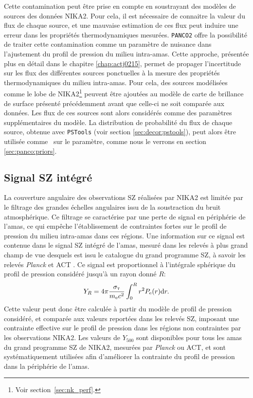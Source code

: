 Cette contamination peut être prise en compte en soustrayant des modèles de sources des données NIKA2.
Pour cela, il est nécessaire de connaitre la valeur du flux de chaque source, et une mauvaise estimation de ces flux peut induire une erreur dans les propriétés thermodynamiques mesurées.
\texttt{PANCO2} offre la possibilité de traiter cette contamination comme un paramètre de nuisance dans l'ajustement du profil de pression du milieu intra-amas.
Cette approche, présentée plus en détail dans le chapitre \ref{chap:actj0215}, permet de propager l'incertitude sur les flux des différentes sources ponctuelles à la mesure des propriétés thermodynamiques du milieu intra-amas.
Pour cela, des sources modélisées comme le lobe de NIKA2\footnote{Voir section~\ref{sec:nk_perf}.} peuvent être ajoutées au modèle de carte de brillance de surface présenté précédemment avant que celle-ci ne soit comparée aux données.
Les flux de ces sources sont alors considérés comme des paramètres supplémentaires du modèle.
La distribution de probabilité du flux de chaque source, obtenue avec \texttt{PSTools} (voir section \ref{sec:decor:pstools}), peut alors être utilisée comme \prior\ sur le paramètre, comme nous le verrons en section \ref{sec:panco:priors}.

\subsection{Signal SZ intégré}

La couverture angulaire des observations SZ réalisées par NIKA2 est limitée par le filtrage des grandes échelles angulaires issu de la soustraction du bruit atmosphérique.
Ce filtrage se caractérise par une perte de signal en périphérie de l'amas, ce qui empêche l'établissement de contraintes fortes sur le profil de pression du milieu intra-amas dans ces régions.
Une information sur ce signal est contenue dans le signal SZ intégré de l'amas, mesuré dans les relevés à plus grand champ de vue desquels est issu le catalogue du grand programme SZ, à savoir les relevés \textit{Planck} \cite{planck_collaboration_planck_2016-2} et ACT \cite{hasselfield_atacama_2013}.
Ce signal est proportionnel à l'intégrale sphérique du profil de pression considéré jusqu'à un rayon donné $R$:
\begin{equation}
    Y_R = 4 \pi \frac{\sigma_\textsc{t}}{m_{\rm e} c^2} \int_0^R r^2 P_{\rm e}(r) \mathrm{d} r.
\end{equation}
Cette valeur peut donc être calculée à partir du modèle de profil de pression considéré, et comparée aux valeurs reportées dans les relevés SZ, imposant une contrainte effective sur le profil de pression dans les régions non contraintes par les observations NIKA2.
Les valeurs de $Y_{500}$ sont disponibles pour tous les amas du grand programme SZ de NIKA2, mesurées par \textit{Planck} ou ACT, et sont systématiquement utilisées afin d'améliorer la contrainte du profil de pression dans la périphérie de l'amas.

